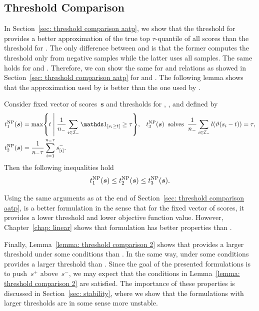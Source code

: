 \subsection{Threshold Comparison}

In Section~\ref{sec: threshold comparison aatp}, we show that the threshold for \TopMeanK provides a better approximation of the true top $\tau$-quantile of all scores than the threshold for \PatMat. The only difference between \tauFPL and \TopMeanK is that the former computes the threshold only from negative samples while the latter uses all samples. The same holds for \PatMatNP and \PatMat. Therefore, we can show the same for \tauFPL and \PatMatNP relations as showed in Section~\ref{sec: threshold comparison aatp} for \TopMeanK and \PatMat. The following lemma shows that the approximation used by \tauFPL is better than the one used by \PatMatNP.

\begin{lemma}
  Consider fixed vector of scores~$\bm{s}$ and thresholds for \GrillNP, \tauFPL, and \PatMatNP defined by
  \begin{align*}
    t_1^{\rm NP}(\bm{s}) &
      = \max \Set{t}{\frac{1}{\nneg} \sum_{i \in \Ineg} \Iverson{s_i \geq t} \geq \tau}, &
    t_3^{\rm NP}(\bm{s}) &
    \;\; \text{solves} \;\; \frac{1}{\nneg} \sum_{i \in \Ineg} l\Brac{\vartheta(s_i - t)} = \tau, \\
    t_2^{\rm NP}(\bm{s}) &
      = \frac{1}{\nneg \tau} \sum_{i=1}^{\nneg \tau} s^{-}_{[i]}.
  \end{align*}
  Then the following inequalities hold
  \begin{equation*}
    t_1^{\rm NP}(\bm{s}) \leq t_2^{\rm NP}(\bm{s}) \leq t_3^{\rm NP}(\bm{s}).
  \end{equation*}
\end{lemma}

Using the same arguments as at the end of Section~\ref{sec: threshold comparison aatp}, \tauFPL is a better formulation in the sense that for the fixed vector of scores, it provides a lower threshold and lower objective function value. However, Chapter~\ref{chap: linear} shows that \PatMatNP formulation has better properties than \tauFPL.

Finally, Lemma~\ref{lemma: threshold comparison 2} shows that \Grill provides a larger threshold under some conditions than \GrillNP. In the same way, \TopMeanK under some conditions provides a larger threshold than \tauFPL. Since the goal of the presented formulations is to push~$s^+$ above~$s^-$, we may expect that the conditions in Lemma~\ref{lemma: threshold comparison 2} are satisfied. The importance of these properties is discussed in Section~\ref{sec: stability}, where we show that the formulations with larger thresholds are in some sense more unstable.


